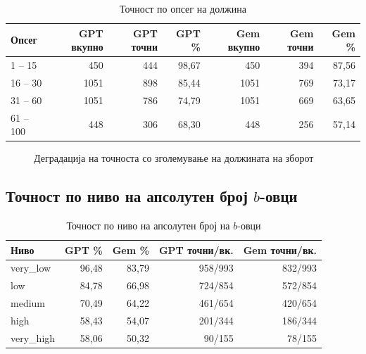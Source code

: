 \documentclass[12pt,a4paper]{article}
\theoremstyle{definition}
\begin{document}
\begin{table}[H]
\centering
\begin{tabular}{lrrrrrr}
\toprule
\textbf{Опсег} & \textbf{GPT вкупно} & \textbf{GPT точни} & \textbf{GPT \%} & \textbf{Gem вкупно} & \textbf{Gem точни} & \textbf{Gem \%} \\
\midrule
1 -- 15   & 450  & 444 & 98,67 & 450  & 394 & 87,56 \\
16 -- 30  & 1051 & 898 & 85,44 & 1051 & 769 & 73,17 \\
31 -- 60  & 1051 & 786 & 74,79 & 1051 & 669 & 63,65 \\
61 -- 100 & 448  & 306 & 68,30 & 448  & 256 & 57,14 \\
\bottomrule
\end{tabular}
\caption{Точност по опсег на должина}
\end{table}

\begin{figure}[H]
\centering
{}
\caption{Деградација на точноста со зголемување на должината на зборот}
\end{figure}

\subsection{Точност по ниво на апсолутен број $b$-овци}

\begin{table}[H]
\centering
\begin{tabular}{lrrrr}
\toprule
\textbf{Ниво} & \textbf{GPT \%} & \textbf{Gem \%} & \textbf{GPT точни/вк.} & \textbf{Gem точни/вк.} \\
\midrule
very\_low  & 96,48 & 83,79 & 958/993  & 832/993  \\
low        & 84,78 & 66,98 & 724/854  & 572/854  \\
medium     & 70,49 & 64,22 & 461/654  & 420/654  \\
high       & 58,43 & 54,07 & 201/344  & 186/344  \\
very\_high & 58,06 & 50,32 & 90/155   & 78/155   \\
\bottomrule
\end{tabular}
\caption{Точност по ниво на апсолутен број на $b$-овци}
\end{table}
\end{document}
